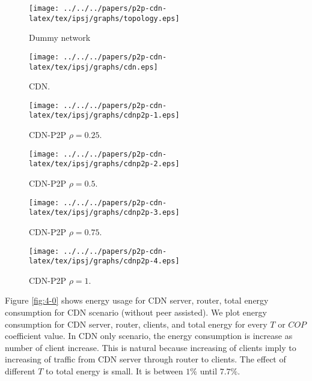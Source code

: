 \begin{figure}[thb]
\begin{center}
\texttt{[image: ../../../papers/p2p-cdn-latex/tex/ipsj/graphs/topology.eps]}
\end{center}
\caption{Dummy network}
\label{fig:dummy}
\vspace{-2mm}
\end{figure} 


\begin{figure*}[t]
\centering
\begin{minipage}[b]{0.3\linewidth}
	\texttt{[image: ../../../papers/p2p-cdn-latex/tex/ipsj/graphs/cdn.eps]}
	\caption{CDN.}
	\label{fig:4-0}
\end{minipage}
\hfill
\begin{minipage}[b]{0.3\linewidth}
	\texttt{[image: ../../../papers/p2p-cdn-latex/tex/ipsj/graphs/cdnp2p-1.eps]}
	\caption{CDN-P2P $\rho=0.25$.}
	\label{fig:4-1}
\end{minipage}
\hfill
\begin{minipage}[b]{0.3\linewidth}
	\texttt{[image: ../../../papers/p2p-cdn-latex/tex/ipsj/graphs/cdnp2p-2.eps]}
	\caption{CDN-P2P $\rho=0.5$.}
	\label{fig:4-2}
\end{minipage}
\hfill
\begin{minipage}[b]{0.35\linewidth}
	\texttt{[image: ../../../papers/p2p-cdn-latex/tex/ipsj/graphs/cdnp2p-3.eps]}
	\caption{CDN-P2P $\rho=0.75$.}
	\label{fig:4-3}
\end{minipage}
\hfill
\begin{minipage}[b]{0.35\linewidth}
	\texttt{[image: ../../../papers/p2p-cdn-latex/tex/ipsj/graphs/cdnp2p-4.eps]}
	\caption{CDN-P2P $\rho=1$.}
	\label{fig:4-4}
\end{minipage}
\label{fig:main}
\end{figure*}

Figure \ref{fig:4-0} shows energy usage for CDN server, router, total energy consumption for CDN scenario (without peer assisted).
We plot energy consumption for CDN server, router, clients, and total energy for every $T$ or $COP$ coefficient value.
In CDN only scenario, the energy consumption is increase as number of client increase.  
This is natural because increasing of clients imply to increasing of traffic from CDN server through router to clients.
The effect of different $T$ to total energy is small.  
It is between $1\%$ until $7.7\%$.

